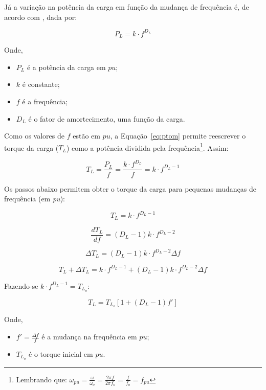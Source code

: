 J{\'a} a varia{\c c}{\~a}o na pot{\^e}ncia da carga em fun{\c c}{\~a}o da mudan{\c c}a de frequ{\^e}ncia {\'e}, de acordo com \citeauthor{get6449}, dada por:

\begin{equation}
	\label{eq:plkfdl}
	P_{L} = k\cdot f^{D_{L}}
\end{equation}

Onde,

\begin{itemize}
	\item[] $P_{L}$ {\'e} a pot{\^e}ncia da carga em $pu$;
	\item[] $k$ {\'e} constante;
	\item[] $f$ {\'e} a frequ{\^e}ncia;
	\item[] $D_{L}$ {\'e} o fator de amortecimento, uma fun{\c c}{\~a}o da carga.
\end{itemize}

Como os valores de $f$ est{\~a}o em $pu$, a Equa{\c c}{\~a}o~\ref{eq:ptom} permite reescrever o torque da carga ($T_{L}$) como a pot{\^e}ncia dividida pela frequ{\^e}ncia\footnote{Lembrando que: $\omega_{pu} = \frac{\omega}{\omega_{o}} = \frac{2\pi f}{2\pi f_{o}} = \frac{f}{f_{o}} = f_{pu}$}. Assim:

\begin{equation}
	\label{eq:tlf}
	T_{L} = \frac{P_{L}}{f} = \frac{k \cdot f^{D_{L}}}{f} = k \cdot f^{D_{L}-1}
\end{equation}

Os passos abaixo permitem obter o torque da carga para pequenas mudan{\c c}as de frequ{\^e}ncia (em \textit{pu}):

\[
T_{L} = k \cdot f^{D_{L}-1}
\]

\[
\frac{dT_{L}}{df} = \left(D_{L}-1\right)k \cdot f^{D_{L}-2}
\]

\[
\Delta T_{L} = \left(D_{L}-1\right) k \cdot f^{D_{L}-2} \Delta f
\]

\[
T_{L} + \Delta T_{L} = k \cdot f^{D_{L}-1} + \left(D_{L}-1\right) k \cdot f^{D_{L}-2} \Delta f
\]

Fazendo-se $k \cdot f^{D_{L}-1} = T_{L_{o}}$:

\begin{equation}
	\label{eq:tl}
	T_{L} = T_{L_{o}} \left[1 + \left(D_{L}-1\right)f'\right]
\end{equation}

Onde,

\begin{itemize}
	\item[] $f' = \frac{\Delta f}{f}$ {\'e} a mudan{\c c}a na frequ{\^e}ncia em $pu$;
	\item[] $T_{L_{o}}$ {\'e} o torque inicial em $pu$.
\end{itemize}

